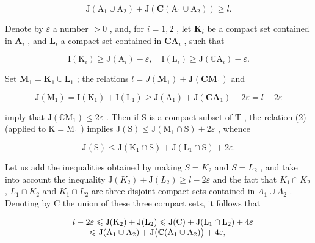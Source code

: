 \[
\mathrm{J} \left(\mathrm{A} _ {1} \cup \mathrm{A} _ {2}\right) + \mathrm{J} \left(\mathbf {C} \left(\mathrm{A} _ {1} \cup \mathrm{A} _ {2}\right)\right) \geqslant l.\tag{3}
\]

Denote by \(\varepsilon\) a number \(>0\) , and, for \(i = 1,2\) , let \(\mathbf{K}_i\) be a compact set contained in \(\mathbf{A}_i\) , and \(\mathbf{L}_i\) a compact set contained in \(\mathbf{C}\mathbf{A}_i\) , such that

\[
\mathrm{I} \left(\mathrm{K} _ {i}\right) \geqslant \mathrm{J} \left(\mathrm{A} _ {i}\right) - \varepsilon , \quad \mathrm{I} \left(\mathrm{L} _ {i}\right) \geqslant \mathrm{J} \left(\mathbb {C} \mathrm{A} _ {i}\right) - \varepsilon .
\]

Set \(\mathbf{M}_1 = \mathbf{K}_1\cup \mathbf{L}_1\) ; the relations \(l = J(\mathbf{M}_1) + \mathbf{J}(\mathbf{C}\mathbf{M}_1)\) and

\[
\mathrm{J} \left(\mathrm{M} _ {1}\right) = \mathrm{I} \left(\mathrm{K} _ {1}\right) + \mathrm{I} \left(\mathrm{L} _ {1}\right) \geqslant \mathrm{J} \left(\mathrm{A} _ {1}\right) + \mathrm{J} \left(\mathbf {C A} _ {1}\right) - 2 \varepsilon = l - 2 \varepsilon
\]

imply that \(\mathrm{J}(\mathbb{C}\mathrm{M}_1) \leqslant 2\varepsilon\) . Then if \(\mathrm{S}\) is a compact subset of \(\mathrm{T}\) , the relation (2) (applied to \(\mathrm{K} = \mathrm{M}_1\) ) implies \(\mathrm{J}(\mathrm{S}) \leqslant \mathrm{J}(\mathrm{M}_1 \cap \mathrm{S}) + 2\varepsilon\) , whence

\[
\mathrm{J} (\mathrm{S}) \leqslant \mathrm{J} (\mathrm{K} _ {1} \cap \mathrm{S}) + \mathrm{J} (\mathrm{L} _ {1} \cap \mathrm{S}) + 2 \varepsilon .
\]

Let us add the inequalities obtained by making \(S = K_{2}\) and \(S = L_{2}\) , and take into account the inequality \(\mathrm{J}(K_{2}) + \mathrm{J}(L_{2}) \geqslant l - 2\varepsilon\) and the fact that \(K_{1} \cap K_{2}\) , \(L_{1} \cap K_{2}\) and \(K_{1} \cap L_{2}\) are three disjoint compact sets contained in \(A_{1} \cup A_{2}\) . Denoting by C the union of these three compact sets, it follows that

\[
\begin{array}{r l} & {l - 2 \varepsilon \leqslant \mathrm{J} (\mathrm{K} _ {2}) + \mathrm{J} (\mathrm{L} _ {2}) \leqslant \mathrm{J} (\mathrm{C}) + \mathrm{J} (\mathrm{L} _ {1} \cap \mathrm{L} _ {2}) + 4 \varepsilon} \\ & {\qquad \leqslant \mathrm{J} (\mathrm{A} _ {1} \cup \mathrm{A} _ {2}) + \mathrm{J} \big (\mathbb {C} (\mathrm{A} _ {1} \cup \mathrm{A} _ {2}) \big) + 4 \varepsilon ,} \end{array}
\]

